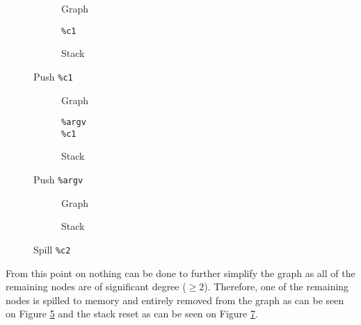 \documentclass{article}
\begin{document}
\begin{figure}[H]
  \centering
  \begin{minipage}[b]{0.31\linewidth}
    \begin{subfigure}[b]{0.70\textwidth}
      
      \caption{Graph}\label{fig:countdown.dot2}
    \end{subfigure}
    \begin{subfigure}[b]{0.27\textwidth}
      \centering
        \texttt{\%c1}
        \vspace{0.5em}
      \caption{Stack}\label{fig:countdown.stack2}
    \end{subfigure}
    \caption{Push \texttt{\%c1}}
  \end{minipage}%
  \begin{minipage}[b]{0.31\linewidth}
    \begin{subfigure}[b]{0.70\textwidth}
      
      \caption{Graph}\label{fig:countdown.dot3}
    \end{subfigure}
    \begin{subfigure}[b]{0.27\textwidth}
      \centering
        \texttt{\%argv}\\
        \texttt{\%c1}
        \vspace{0.5em}
      \caption{Stack}\label{fig:countdown.stack3}
    \end{subfigure}
    \caption{Push \texttt{\%argv}}
  \end{minipage}%
  \begin{minipage}[b]{0.31\linewidth}
    \begin{subfigure}[b]{0.70\textwidth}
      
      \caption{Graph}\label{fig:countdown.dot4}
    \end{subfigure}
    \begin{subfigure}[b]{0.27\textwidth}
      \caption{Stack}\label{fig:countdown.stack4}
    \end{subfigure}
    \caption{Spill \texttt{\%c2}}
  \end{minipage}%
\end{figure}
\noindent From this point on  nothing can be done to further simplify the graph as all of the remaining nodes are of significant degree (\(\geq 2\)). Therefore, one of the remaining nodes is spilled to memory and entirely removed from the graph as can be seen on Figure \ref{fig:countdown.dot4} and the stack reset as can be seen on Figure \ref{fig:countdown.stack4}.
\end{document}
